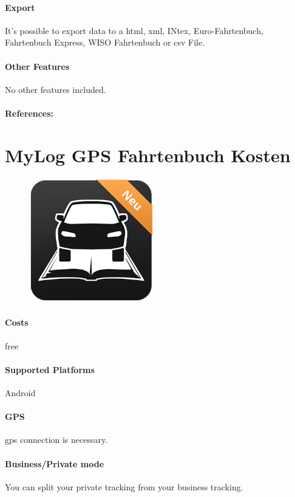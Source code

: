 \paragraph{Export} It’s possible to export data to a \gls{html}, \gls{xml}, INtex, Euro-Fahrtenbuch, Fahrtenbuch Express, WISO Fahrtenbuch or \gls{csv} File.
\paragraph{Other Features} No other features included.
\paragraph{References:} \cite{Fahrtenbuch_myLogbook}
\newpage

\section{MyLog GPS Fahrtenbuch Kosten}
\begin{figure}
  \begin{center}
    \includegraphics[width=0.48\textwidth]{bilder/mylog}
  \end{center}
\end{figure}
\paragraph{Costs} free
\paragraph{Supported Platforms} Android
\paragraph{GPS} \gls{gps} connection is necessary.
\paragraph{Business/Private mode} You can split your private tracking from your business tracking.
